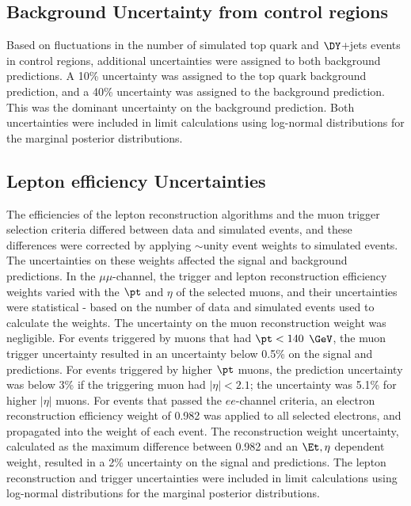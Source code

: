 \subsection{Background Uncertainty from control regions}
\label{sec:bkgndNormUnc}
Based on fluctuations in the number of simulated top quark and $\DY$+jets events in control regions, additional uncertainties 
were assigned to both background predictions.  A 10\% uncertainty was assigned to the top quark background prediction, and a 
40\% uncertainty was assigned to the \DY background prediction.  This was the dominant uncertainty on the \DY background 
prediction.  Both uncertainties were included in limit calculations using log-normal distributions for the marginal posterior 
distributions.

\subsection{Lepton efficiency Uncertainties}
\label{sec:leptonRecoTriggerEffUnc}
The efficiencies of the lepton reconstruction algorithms and the muon trigger selection criteria differed between data and simulated 
events, and these differences were corrected by applying $\sim$unity event weights to simulated events.  The uncertainties on 
these weights affected the signal and \DY background predictions.  In the $\mu\mu$-channel, the trigger and lepton reconstruction 
efficiency weights varied with the $\pt$ and $\eta$ of the selected muons, and their uncertainties were statistical - based on the 
number of data and simulated events used to calculate the weights.  The uncertainty 
on the muon reconstruction weight was negligible.  For events triggered by muons that had $\pt < 140$ $\GeV$, the muon trigger 
uncertainty resulted in an uncertainty below 0.5\% on the signal and \DY predictions.  For events triggered by higher $\pt$ 
muons, the prediction uncertainty was below 3\% if the triggering muon had $|\eta| < 2.1$; the uncertainty was 5.1\% for higher 
$|\eta|$ muons.  For events that passed the $ee$-channel criteria, an electron reconstruction efficiency weight of 0.982 
was applied to all selected electrons, and propagated into the weight of each event.  The reconstruction weight uncertainty, 
calculated as the maximum difference between 0.982 and an $\Et,\eta$ dependent weight, resulted in a 2\% uncertainty on the 
signal and \DY predictions.  The lepton reconstruction and trigger uncertainties were included in limit calculations using 
log-normal distributions for the marginal posterior distributions.

